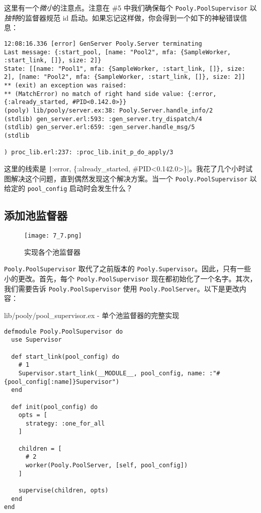 这里有一个\emph{微小}的注意点。注意在 \#5 中我们确保每个
\texttt{Pooly.PoolSupervisor} 以\emph{独特}的监督器规范
id 启动。如果忘记这样做，你会得到一个如下的神秘错误信息：

\begin{code}{}
\begin{verbatim}
12:08:16.336 [error] GenServer Pooly.Server terminating
Last message: {:start_pool, [name: "Pool2", mfa: {SampleWorker, :start_link, []}, size: 2]}
State: [[name: "Pool1", mfa: {SampleWorker, :start_link, []}, size: 2], [name: "Pool2", mfa: {SampleWorker, :start_link, []}, size: 2]]
** (exit) an exception was raised:
** (MatchError) no match of right hand side value: {:error, {:already_started, #PID<0.142.0>}}
(pooly) lib/pooly/server.ex:38: Pooly.Server.handle_info/2
(stdlib) gen_server.erl:593: :gen_server.try_dispatch/4
(stdlib) gen_server.erl:659: :gen_server.handle_msg/5
(stdlib

) proc_lib.erl:237: :proc_lib.init_p_do_apply/3
\end{verbatim}
\end{code}

这里的线索是
\texttt|{:error, \{:already_started, \#PID<0.142.0>\}}|。我花了几个小时试图解决这个问题，直到偶然发现这个解决方案。当一个
\texttt{Pooly.PoolSupervisor} 以给定的
\texttt{pool\_config} 启动时会发生什么？

\subsection{添加池监督器}

\begin{figure}[!ht]
    \centering
    \texttt{[image: 7\_7.png]}
    \caption{实现各个池监督器}
    \label{fig:7_7}
\end{figure}

\texttt{Pooly.PoolSupervisor} 取代了之前版本的
\texttt{Pooly.Supervisor}。因此，只有一些小的更改。首先，每个
\texttt{Pooly.PoolSupervisor}
现在都初始化了一个名字。其次，我们需要告诉
\texttt{Pooly.PoolSupervisor} 使用
\texttt{Pooly.PoolServer}。以下是更改内容：

\begin{code}{lib/pooly/pool\_supervisor.ex - 单个池监督器的完整实现}

\begin{verbatim}
defmodule Pooly.PoolSupervisor do
  use Supervisor

  def start_link(pool_config) do
    # 1
    Supervisor.start_link(__MODULE__, pool_config, name: :"#{pool_config[:name]}Supervisor")
  end

  def init(pool_config) do
    opts = [
      strategy: :one_for_all
    ]

    children = [
      # 2
      worker(Pooly.PoolServer, [self, pool_config])
    ]

    supervise(children, opts)
  end
end
\end{verbatim}
\end{code}

